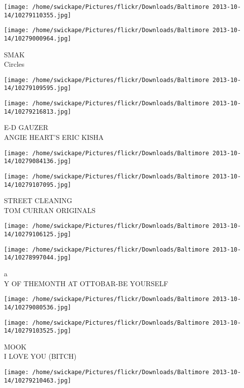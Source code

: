 \documentclass[10pt,letterpaper]{article}
\begin{document}
\texttt{[image: /home/swickape/Pictures/flickr/Downloads/Baltimore 2013-10-14/10279110355.jpg]}

\vspace{0.25in}
\texttt{[image: /home/swickape/Pictures/flickr/Downloads/Baltimore 2013-10-14/10279000964.jpg]}

SMAK\\
Circles
\pagebreak

\texttt{[image: /home/swickape/Pictures/flickr/Downloads/Baltimore 2013-10-14/10279109595.jpg]}

\vspace{0.25in}
\texttt{[image: /home/swickape/Pictures/flickr/Downloads/Baltimore 2013-10-14/10279216813.jpg]}

E{-}D GAUZER\\
ANGIE HEART'S ERIC KISHA
\pagebreak

\texttt{[image: /home/swickape/Pictures/flickr/Downloads/Baltimore 2013-10-14/10279084136.jpg]}

\vspace{0.25in}
\texttt{[image: /home/swickape/Pictures/flickr/Downloads/Baltimore 2013-10-14/10279107095.jpg]}

STREET CLEANING\\
TOM CURRAN ORIGINALS
\pagebreak

\texttt{[image: /home/swickape/Pictures/flickr/Downloads/Baltimore 2013-10-14/10279106125.jpg]}

\vspace{0.25in}
\texttt{[image: /home/swickape/Pictures/flickr/Downloads/Baltimore 2013-10-14/10278997044.jpg]}

a\\
Y OF THEMONTH AT OTTOBAR{-}BE YOURSELF
\pagebreak

\texttt{[image: /home/swickape/Pictures/flickr/Downloads/Baltimore 2013-10-14/10279080536.jpg]}

\vspace{0.25in}
\texttt{[image: /home/swickape/Pictures/flickr/Downloads/Baltimore 2013-10-14/10279103525.jpg]}

MOOK\\
I LOVE YOU (BITCH)
\pagebreak

\texttt{[image: /home/swickape/Pictures/flickr/Downloads/Baltimore 2013-10-14/10279210463.jpg]}
\end{document}
